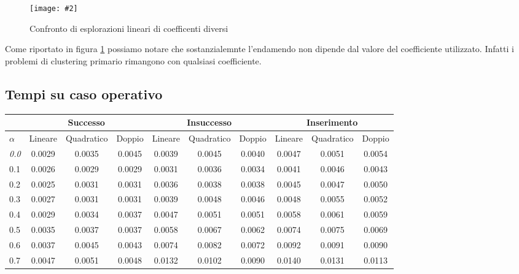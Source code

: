 \documentclass{article}
\newcommand{\image}[3][1]{
	\centering
	\texttt{[image: \#2]}
	\caption{#3}
}
\begin{document}
\begin{figure}[H]
\image[0.75]{Successo_Confronto_Lineare_c1_c5_scala_logaritmica}{Confronto di esplorazioni lineari di coefficenti diversi}
\label{fig:Confronto_coefficienti}
\end{figure}

Come riportato in figura \ref{fig:Confronto_coefficienti} possiamo notare che sostanzialemnte l'endamendo non dipende dal valore del coefficiente utilizzato. Infatti i problemi di clustering primario rimangono con qualsiasi coefficiente.

\subsection{Tempi su caso operativo}

\begin{center}
\begin{table}[H]
\begin{tabular}{c|c|c|c||c|c|c||c|c|c|}
\cline{2-10}
& \multicolumn{3}{c||}{Successo} & \multicolumn{3}{c||}{Insuccesso} & \multicolumn{3}{c|}{Inserimento} \\
\hline
\multicolumn{1}{|l|}{$\alpha$} & Lineare & Quadratico & Doppio & Lineare & Quadratico & Doppio  & Lineare & Quadratico & Doppio \\
\hline
\multicolumn{1}{|l|}{\emph{0.0}} & 0.0029 & 0.0035 & 0.0045 & 0.0039 & 0.0045 & 0.0040 & 0.0047 & 0.0051 & 0.0054 \\
\hline
\multicolumn{1}{|l|}{0.1} & 0.0026 & 0.0029 & 0.0029 & 0.0031 & 0.0036 & 0.0034 & 0.0041 & 0.0046 & 0.0043 \\
\hline
\multicolumn{1}{|l|}{0.2} & 0.0025 & 0.0031 & 0.0031 & 0.0036 & 0.0038 & 0.0038 & 0.0045 & 0.0047 & 0.0050 \\
\hline
\multicolumn{1}{|l|}{0.3} & 0.0027 & 0.0031 & 0.0031 & 0.0039 & 0.0048 & 0.0046 & 0.0048 & 0.0055 & 0.0052 \\
\hline
\multicolumn{1}{|l|}{0.4} & 0.0029 & 0.0034 & 0.0037 & 0.0047 & 0.0051 & 0.0051 & 0.0058 & 0.0061 & 0.0059 \\
\hline
\multicolumn{1}{|l|}{0.5} & 0.0035 & 0.0037 & 0.0037 & 0.0058 & 0.0067 & 0.0062 & 0.0074 & 0.0075 & 0.0069 \\
\hline
\multicolumn{1}{|l|}{0.6} & 0.0037 & 0.0045 & 0.0043 & 0.0074 & 0.0082 & 0.0072 & 0.0092 & 0.0091 & 0.0090 \\
\hline
\multicolumn{1}{|l|}{0.7} & 0.0047 & 0.0051 & 0.0048 & 0.0132 & 0.0102 & 0.0090 & 0.0140 & 0.0131 & 0.0113 \\

\end{tabular}
\end{table}
\end{center}
\end{document}
